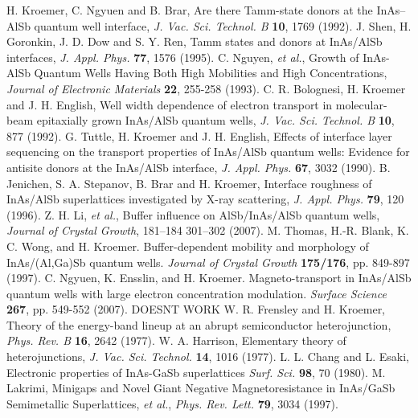 \documentclass[titlepage,a4paper]{book}
\begin{document}
\begin{thebibliography}{199}
H. Kroemer, C. Ngyuen and B. Brar, Are there Tamm-state donors at the InAs–AlSb quantum well interface, \textit{J. Vac. Sci. Technol. B} \textbf{10}, 1769 (1992). 
J. Shen, H. Goronkin, J. D. Dow and S. Y. Ren, Tamm states and donors at InAs/AlSb interfaces, \textit{J. Appl. Phys.} \textbf{77}, 1576 (1995).
C. Nguyen, \textit{et al.}, Growth of InAs-AlSb Quantum Wells Having Both High Mobilities and High Concentrations, \textit{Journal of Electronic Materials} \textbf{22}, 255-258 (1993).
C. R. Bolognesi, H. Kroemer and J. H. English, Well width dependence of electron transport in molecular-beam epitaxially grown InAs/AlSb quantum wells, \textit{J. Vac. Sci. Technol. B} \textbf{10}, 877 (1992).
G. Tuttle, H. Kroemer and J. H. English, Effects of interface layer sequencing on the transport properties of InAs/AlSb quantum wells: Evidence for antisite donors at the InAs/AlSb interface, \textit{J. Appl. Phys.} \textbf{67}, 3032 (1990).
B. Jenichen, S. A. Stepanov, B. Brar and H. Kroemer, Interface roughness of InAs/AlSb superlattices investigated by X-ray scattering, \textit{J. Appl. Phys.} \textbf{79}, 120 (1996).
Z. H. Li, \textit{et al.}, Buffer influence on AlSb/InAs/AlSb quantum wells, \textit{Journal of Crystal Growth}, 181–184 301–302 (2007).
M. Thomas, H.-R. Blank, K. C. Wong, and H. Kroemer. Buffer-dependent mobility and morphology of InAs/(Al,Ga)Sb quantum wells. \textit{Journal of Crystal Growth} \textbf{175/176}, pp. 849-897 (1997).
C. Ngyuen, K. Ensslin, and H. Kroemer. Magneto-transport in InAs/AlSb quantum wells with large electron concentration modulation. \textit{Surface Science} \textbf{267}, pp. 549-552 (2007).
DOESNT WORK
W. R. Frensley and H. Kroemer, Theory of the energy-band lineup at an abrupt semiconductor heterojunction, \textit{Phys. Rev. B} \textbf{16}, 2642 (1977).
W. A. Harrison, Elementary theory of heterojunctions, \textit{J. Vac. Sci. Technol.} \textbf{14}, 1016 (1977).
L. L. Chang and L. Esaki, Electronic properties of InAs-GaSb superlattices \textit{Surf. Sci.} \textbf{98}, 70 (1980).
M. Lakrimi, Minigaps and Novel Giant Negative Magnetoresistance in InAs/GaSb Semimetallic Superlattices, \textit{et al.}, \textit{Phys. Rev. Lett.} \textbf{79}, 3034 (1997).

\end{thebibliography}
\end{document}
